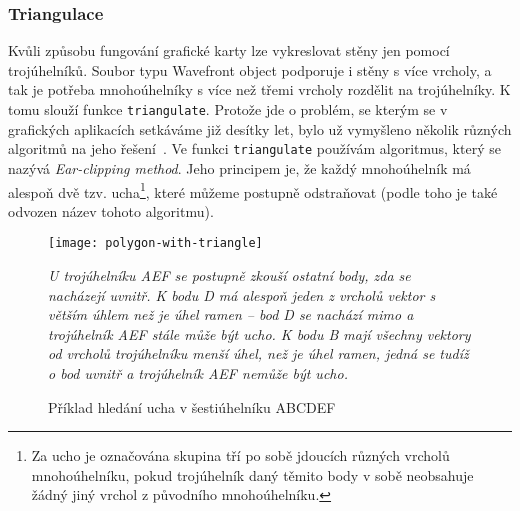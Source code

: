 \documentclass[a4paper, 11pt]{report}
\begin{document}
\subsubsection{Triangulace}
Kvůli způsobu fungování grafické karty lze vykreslovat stěny jen pomocí trojúhelníků. Soubor typu Wavefront object podporuje i stěny s více vrcholy, a tak je potřeba mnohoúhelníky s více než třemi vrcholy rozdělit na trojúhelníky. K tomu slouží funkce \texttt{triangulate}. Protože jde o problém, se kterým se v grafických aplikacích setkáváme již desítky let, bylo už vymyšleno několik různých algoritmů na jeho řešení~\cite{wiki:triangulation}. Ve funkci \texttt{triangulate} používám algoritmus, který se nazývá \emph{Ear-clipping method}. Jeho principem je, že každý mnohoúhelník má alespoň dvě tzv. ucha\footnote{Za ucho je označována skupina tří po sobě jdoucích různých vrcholů mnohoúhelníku, pokud trojúhelník daný těmito body v sobě neobsahuje žádný jiný vrchol z původního mnohoúhelníku.}, které můžeme postupně odstraňovat (podle toho je také odvozen název tohoto algoritmu).

\begin{figure}[h]
    \texttt{[image: polygon-with-triangle]}
    \caption[Příklad hledání ucha v šestiúhelníku]{
    Příklad hledání ucha v šestiúhelníku ABCDEF}
    \small\emph{
    U trojúhelníku AEF se postupně zkouší ostatní body, zda se nacházejí uvnitř. K bodu D má alespoň jeden z vrcholů vektor s větším úhlem než je úhel ramen -- bod D se nachází mimo a trojúhelník AEF stále může být ucho. K bodu B mají všechny vektory od vrcholů trojúhelníku menší úhel, než je úhel ramen, jedná se tudíž o bod uvnitř a trojúhelník AEF nemůže být ucho.}
\end{figure}
\end{document}
